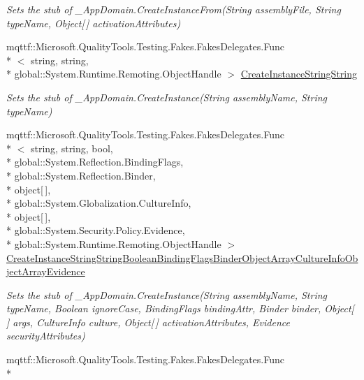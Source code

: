 \begin{DoxyCompactItemize}
\begin{DoxyCompactList}\small\item\em Sets the stub of \-\_\-\-App\-Domain.\-Create\-Instance\-From(\-String assembly\-File, String type\-Name, Object\mbox{[}$\,$\mbox{]} activation\-Attributes)\end{DoxyCompactList}\item 
mqttf\-::\-Microsoft.\-Quality\-Tools.\-Testing.\-Fakes.\-Fakes\-Delegates.\-Func\\*
$<$ string, string, \\*
global\-::\-System.\-Runtime.\-Remoting.\-Object\-Handle $>$ \hyperlink{class_system_1_1_fakes_1_1_stub___app_domain_a6a53101dd2c9a95e3ed81e5c82b65ff8}{Create\-Instance\-String\-String}
\begin{DoxyCompactList}\small\item\em Sets the stub of \-\_\-\-App\-Domain.\-Create\-Instance(\-String assembly\-Name, String type\-Name)\end{DoxyCompactList}\item 
mqttf\-::\-Microsoft.\-Quality\-Tools.\-Testing.\-Fakes.\-Fakes\-Delegates.\-Func\\*
$<$ string, string, bool, \\*
global\-::\-System.\-Reflection.\-Binding\-Flags, \\*
global\-::\-System.\-Reflection.\-Binder, \\*
object\mbox{[}$\,$\mbox{]}, \\*
global\-::\-System.\-Globalization.\-Culture\-Info, \\*
object\mbox{[}$\,$\mbox{]}, \\*
global\-::\-System.\-Security.\-Policy.\-Evidence, \\*
global\-::\-System.\-Runtime.\-Remoting.\-Object\-Handle $>$ \hyperlink{class_system_1_1_fakes_1_1_stub___app_domain_ac74b417b8300cae00107de68e43bf723}{Create\-Instance\-String\-String\-Boolean\-Binding\-Flags\-Binder\-Object\-Array\-Culture\-Info\-Object\-Array\-Evidence}
\begin{DoxyCompactList}\small\item\em Sets the stub of \-\_\-\-App\-Domain.\-Create\-Instance(\-String assembly\-Name, String type\-Name, Boolean ignore\-Case, Binding\-Flags binding\-Attr, Binder binder, Object\mbox{[}$\,$\mbox{]} args, Culture\-Info culture, Object\mbox{[}$\,$\mbox{]} activation\-Attributes, Evidence security\-Attributes)\end{DoxyCompactList}\item 
mqttf\-::\-Microsoft.\-Quality\-Tools.\-Testing.\-Fakes.\-Fakes\-Delegates.\-Func\\*

\end{DoxyCompactItemize}
